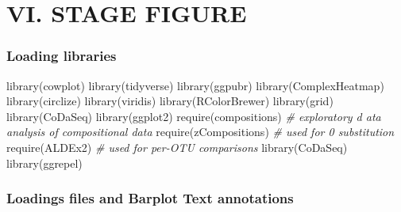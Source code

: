 \documentclass[]{interact}
\theoremstyle{plain}%
\theoremstyle{definition}
\theoremstyle{remark}
\newenvironment{Shaded}{\begin{snugshade}}{\end{snugshade}}
\newcommand{\CommentTok}[1]{\textcolor[rgb]{0.56,0.35,0.01}{\textit{#1}}}
\newcommand{\FunctionTok}[1]{\textcolor[rgb]{0.00,0.00,0.00}{#1}}
\newcommand{\NormalTok}[1]{#1}
\begin{document}
\hypertarget{vi.-stage-figure}{%
\section{VI. STAGE FIGURE}\label{vi.-stage-figure}}

\hypertarget{loading-libraries-4}{%
\subsubsection{Loading libraries}\label{loading-libraries-4}}

\begin{Shaded}
\begin{Highlighting}[]
\FunctionTok{library}\NormalTok{(cowplot)}
\FunctionTok{library}\NormalTok{(tidyverse)}
\FunctionTok{library}\NormalTok{(ggpubr)}
\FunctionTok{library}\NormalTok{(ComplexHeatmap)}
\FunctionTok{library}\NormalTok{(circlize)}
\FunctionTok{library}\NormalTok{(viridis)}
\FunctionTok{library}\NormalTok{(RColorBrewer)}
\FunctionTok{library}\NormalTok{(grid)}
\FunctionTok{library}\NormalTok{(CoDaSeq)}
\FunctionTok{library}\NormalTok{(ggplot2)}
\FunctionTok{require}\NormalTok{(compositions) }\CommentTok{\# exploratory d ata analysis of compositional data}
\FunctionTok{require}\NormalTok{(zCompositions) }\CommentTok{\# used for 0 substitution}
\FunctionTok{require}\NormalTok{(ALDEx2) }\CommentTok{\# used for per{-}OTU comparisons}
\FunctionTok{library}\NormalTok{(CoDaSeq)}
\FunctionTok{library}\NormalTok{(ggrepel)}
\end{Highlighting}
\end{Shaded}

\hypertarget{loadings-files-and-barplot-text-annotations-2}{%
\subsubsection{Loadings files and Barplot Text
annotations}\label{loadings-files-and-barplot-text-annotations-2}}
\end{document}
